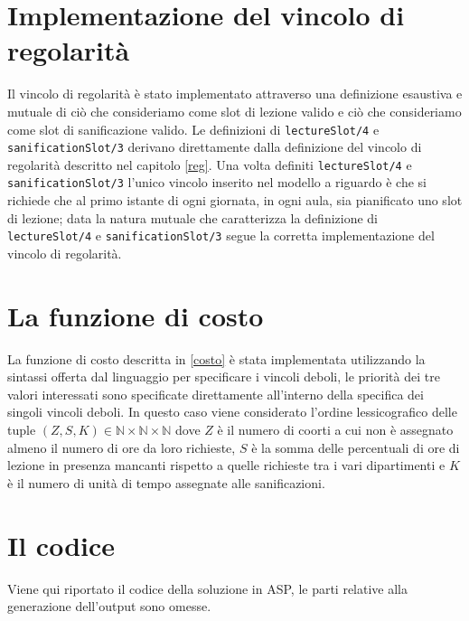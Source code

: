 \documentclass[12pt, italian, openany]{book}
\begin{document}
\section{Implementazione del vincolo di regolarità}
Il vincolo di regolarità è stato implementato attraverso una definizione esaustiva e mutuale di ciò che consideriamo come slot di lezione valido e ciò che consideriamo come slot di sanificazione valido. Le definizioni di \texttt{lectureSlot/4} e \texttt{sanificationSlot/3} derivano direttamente dalla definizione del vincolo di regolarità descritto nel capitolo \ref{reg}.
Una volta definiti \texttt{lectureSlot/4} e \texttt{sanificationSlot/3} l'unico vincolo inserito nel modello a riguardo è che si richiede che al primo istante di ogni giornata, in ogni aula, sia pianificato uno slot di lezione; data la natura mutuale che caratterizza la definizione di \texttt{lectureSlot/4} e \texttt{sanificationSlot/3} segue la corretta implementazione del vincolo di regolarità.

\section{La funzione di costo}
La funzione di costo descritta in \ref{costo} è stata implementata utilizzando la sintassi offerta dal linguaggio per specificare i vincoli deboli, le priorità dei tre valori interessati sono specificate direttamente all'interno della specifica dei singoli vincoli deboli.
In questo caso viene considerato l'ordine lessicografico delle tuple $(Z, S, K) \in \mathbb{N} \times \mathbb{N} \times \mathbb{N}$ dove $Z$ è il numero di coorti a cui non è assegnato almeno il numero di ore da loro richieste, $S$ è la somma delle percentuali di ore di lezione in presenza mancanti rispetto a quelle richieste tra i vari dipartimenti e $K$ è il numero di unità di tempo assegnate alle sanificazioni.

\section{Il codice}
Viene qui riportato il codice della soluzione in ASP, le parti relative alla generazione dell'output sono omesse.


\end{document}
